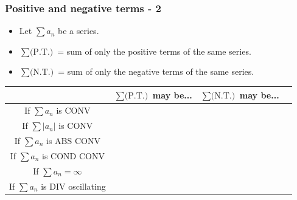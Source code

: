 \documentclass[14pt]{beamer}
\begin{document}
\begin{frame}[t]
	\fontsize{11}{11}\selectfont
	\frametitle{Positive and negative terms - 2}

	\begin{itemize}
		\item Let $\displaystyle \sum a_{n}$ be a series.

		\item $\displaystyle \sum \text{(P.T.)}$ \; = \; sum of only the positive terms
			of the same series.

		\item $\displaystyle \sum \text{(N.T.)}$ \; = \; sum of only the negative terms
			of the same series.
	\end{itemize}
	\begin{center}
		\begin{tabular}{c|c|c|c|}
			                                                 & $\displaystyle \sum \text{(P.T.)}$ may be... & $\displaystyle \sum \text{(N.T.)}$ may be... \\
			\hline
			If $\displaystyle \sum a_{n}$ is CONV            &                                              & \phantom{$\displaystyle \frac{1}{1}$}        \\
			\hline
			If $\displaystyle \sum |a_{n}|$ is CONV          &                                              & \phantom{$\displaystyle \frac{1}{1}$}        \\
			\hline
			If $\displaystyle \sum a_{n}$ is ABS CONV        &                                              & \phantom{$\displaystyle \frac{1}{1}$}        \\
			\hline
			If $\displaystyle \sum a_{n}$ is COND CONV       &                                              & \phantom{$\displaystyle \frac{1}{1}$}        \\
			\hline
			If $\displaystyle \sum a_{n}= \infty$            &                                              & \phantom{$\displaystyle \frac{1}{1}$}        \\
			\hline
			If $\displaystyle \sum a_{n}$ is DIV oscillating &                                              & \phantom{$\displaystyle \frac{1}{1}$}        \\
			\hline
		\end{tabular}
	\end{center}
\end{frame}
\end{document}
